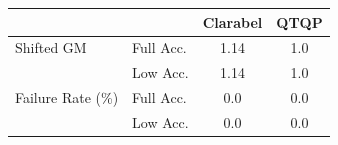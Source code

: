 \begin{tabular}{|l|l|c|c|}
  \hline
   &  & \textbf{Clarabel} & \textbf{QTQP} \\
  \hline
  Shifted GM & Full Acc. & 1.14 & 1.0 \\
   & Low Acc. & 1.14 & 1.0 \\
  Failure Rate (\%) & Full Acc. & 0.0 & 0.0 \\
   & Low Acc. & 0.0 & 0.0 \\
  \hline
\end{tabular}
